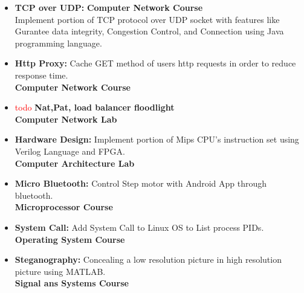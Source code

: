 \documentclass[a4paper,10pt]{article} %
\begin{document}
\begin{itemize}
\begin{itemize}
		\item
			\textbf{TCP over UDP: } \hfill \textbf {Computer Network Course} \\
			Implement portion of TCP protocol over UDP socket with features like Gurantee data integrity, Congestion Control, and Connection using Java programming language.
			
		\item
			\textbf {Http Proxy:} Cache GET method of users http requests in order to reduce response time. \\
			\textbf {Computer Network Course}
			
		\item
			\textcolor{red}{todo}
			\textbf{Nat,Pat, load balancer floodlight}\\
			\textbf {Computer Network Lab}
		
		
		\item
			\textbf{Hardware Design:} Implement portion of Mips CPU's instruction set using Verilog Language and FPGA. \\
			\textbf {Computer Architecture Lab}
			
		\item
			\textbf {Micro Bluetooth:} Control Step motor with Android App through bluetooth.\\
			\textbf {Microprocessor Course}
		
		\item
			\textbf {System Call:} Add System Call to Linux OS to List process PIDs. \\
			\textbf {Operating System Course}
				
		\item
			\textbf{Steganography:} Concealing a low resolution picture in high resolution picture using MATLAB. \\
			\textbf {Signal ans Systems Course}
		
	\end{itemize}

	
\end{itemize}
\end{document}
